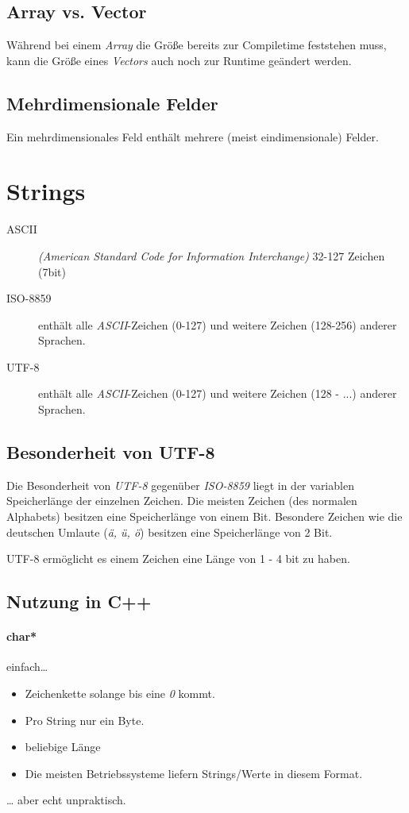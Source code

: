 \documentclass{book}
\begin{document}
\subsection{Array vs. Vector}
Während bei einem \textit{Array} die Größe bereits zur Compiletime feststehen muss,
kann die Größe eines \textit{Vectors} auch noch zur Runtime geändert werden.
\subsection{Mehrdimensionale Felder}
Ein mehrdimensionales Feld enthält mehrere (meist eindimensionale) Felder.
\section{Strings}
\begin{description}
	\item[ASCII] \textit{(American Standard Code for Information Interchange)} 32-127 Zeichen (7bit)
	\item[ISO-8859]  enthält alle \textit{ASCII}-Zeichen (0-127) und weitere Zeichen (128-256) anderer Sprachen.
	\item[UTF-8] enthält alle \textit{ASCII}-Zeichen (0-127) und weitere Zeichen (128 - ...) anderer Sprachen.
\end{description}
\subsection{Besonderheit von UTF-8}
Die Besonderheit von \textit{UTF-8} gegenüber \textit{ISO-8859} liegt in der variablen Speicherlänge der einzelnen Zeichen.
Die meisten Zeichen (des normalen Alphabets) besitzen eine Speicherlänge von einem Bit. Besondere Zeichen wie die deutschen Umlaute (\textit{ä, ü, ö}) besitzen eine Speicherlänge
von 2 Bit.
\begin{tcolorbox}
	UTF-8 ermöglicht es einem Zeichen eine Länge von 1 - 4 bit zu haben.
\end{tcolorbox}
\subsection{Nutzung in C++}
\paragraph{char*} einfach…
\begin{itemize}
	\item Zeichenkette solange bis eine \textit{0} kommt.
	\item Pro String nur ein Byte.
	\item beliebige Länge
	\item Die meisten Betriebssysteme liefern Strings/Werte in diesem Format.
\end{itemize} 
… aber echt unpraktisch.
\end{document}
